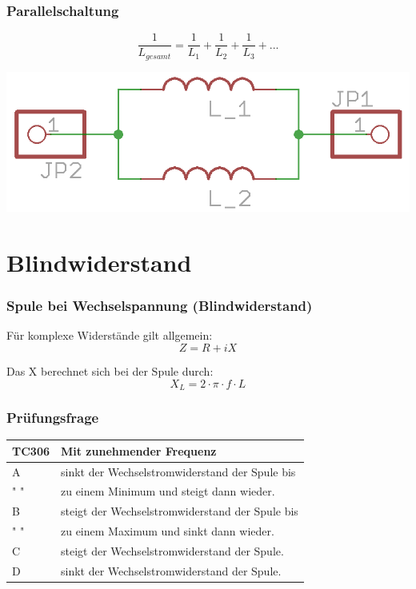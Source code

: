 \begin{frame}
    \frametitle{Parallelschaltung}
    $$\frac{1}{L_{gesamt}} = \frac{1}{L_1} + \frac{1}{L_2} + \frac{1}{L_3} + ...$$
    \begin{center}
        \includegraphics[width=1\textwidth]{e06/L_Parallel.png}
    \end{center}
\end{frame}

\section*{Blindwiderstand}

\begin{frame}
    \frametitle{Spule bei Wechselspannung (Blindwiderstand)}
    Für komplexe Widerstände gilt allgemein:
    $$Z = R + iX$$
    
    Das X berechnet sich bei der Spule durch:
    $$X_L = 2\cdot \pi \cdot f\cdot L $$

\end{frame}

\begin{frame}
    \frametitle{Prüfungsfrage}    
    \begin{center}
    \begin{tabular}{l||l}\hline
        TC306 & Mit zunehmender Frequenz\\\hline\hline
        A & sinkt der Wechselstromwiderstand der Spule bis \\
        " " & zu einem Minimum und steigt dann wieder. \\ \hline
    	B & steigt der Wechselstromwiderstand der Spule bis\\
        " " & zu einem Maximum und sinkt dann wieder. \\ \hline
        C &  steigt der Wechselstromwiderstand der Spule. \\ \hline
        D & sinkt der Wechselstromwiderstand der Spule. \\ \hline
    \end{tabular}
 	    \end{center}
\end{frame}

